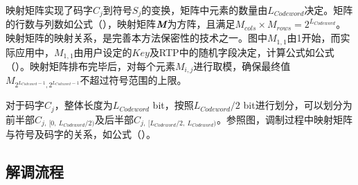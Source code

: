 映射矩阵实现了码字$C_{j}$到符号$S_{j}$的变换，矩阵中元素的数量由$L_{Codeword}$决定。矩阵的行数与列数如公式（），映射矩阵$\textit{\textbf{M}}$为方阵，且满足$M_{cols}\times M_{rows}=2^{L_{Codeword}}$。映射矩阵的映射关系，是完善本方法保密性的技术之一。图中$M_{1,1}$由1开始，而实际应用中，$M_{1,1}$由用户设定的$Key$及RTP中的随机字段决定，计算公式如公式（）。映射矩阵排布完毕后，对每个元素$M_{i,j}$进行取模，确保最终值$M_{2^{L_{Codeword}-1},2^{L_{Codeword}-1}}$不超过符号范围的上限。


对于码字$C_{j}$，整体长度为$L_{Codeword}$ bit，按照$L_{Codeword}/2$ bit进行划分，可以划分为前半部$C_{j,\ [0,\ L_{Codeword}/2)}$及后半部$C_{j,\ [L_{Codeword}/2,\ L_{Codeword})}$。参照图，调制过程中映射矩阵与符号及码字的关系，如公式（）。

\subsection{解调流程}
\label{chap:zigzag:model:demodulation}

